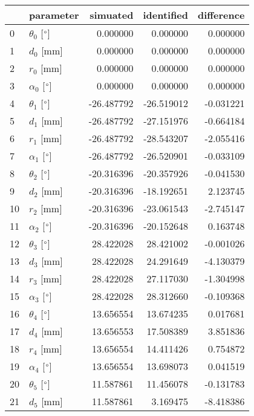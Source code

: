 \documentclass{standalone}%
\begin{document}
%
\normalsize%
\begin{tabular}{llrrr}
\toprule
{} &                 parameter &   simuated & identified & difference \\
\midrule
0  &  $\theta_{0}$ [$\degree$] &   0.000000 &   0.000000 &   0.000000 \\
1  &              $d_{0}$ [mm] &   0.000000 &   0.000000 &   0.000000 \\
2  &              $r_{0}$ [mm] &   0.000000 &   0.000000 &   0.000000 \\
3  &  $\alpha_{0}$ [$\degree$] &   0.000000 &   0.000000 &   0.000000 \\
4  &  $\theta_{1}$ [$\degree$] & -26.487792 & -26.519012 &  -0.031221 \\
5  &              $d_{1}$ [mm] & -26.487792 & -27.151976 &  -0.664184 \\
6  &              $r_{1}$ [mm] & -26.487792 & -28.543207 &  -2.055416 \\
7  &  $\alpha_{1}$ [$\degree$] & -26.487792 & -26.520901 &  -0.033109 \\
8  &  $\theta_{2}$ [$\degree$] & -20.316396 & -20.357926 &  -0.041530 \\
9  &              $d_{2}$ [mm] & -20.316396 & -18.192651 &   2.123745 \\
10 &              $r_{2}$ [mm] & -20.316396 & -23.061543 &  -2.745147 \\
11 &  $\alpha_{2}$ [$\degree$] & -20.316396 & -20.152648 &   0.163748 \\
12 &  $\theta_{3}$ [$\degree$] &  28.422028 &  28.421002 &  -0.001026 \\
13 &              $d_{3}$ [mm] &  28.422028 &  24.291649 &  -4.130379 \\
14 &              $r_{3}$ [mm] &  28.422028 &  27.117030 &  -1.304998 \\
15 &  $\alpha_{3}$ [$\degree$] &  28.422028 &  28.312660 &  -0.109368 \\
16 &  $\theta_{4}$ [$\degree$] &  13.656554 &  13.674235 &   0.017681 \\
17 &              $d_{4}$ [mm] &  13.656553 &  17.508389 &   3.851836 \\
18 &              $r_{4}$ [mm] &  13.656554 &  14.411426 &   0.754872 \\
19 &  $\alpha_{4}$ [$\degree$] &  13.656554 &  13.698073 &   0.041519 \\
20 &  $\theta_{5}$ [$\degree$] &  11.587861 &  11.456078 &  -0.131783 \\
21 &              $d_{5}$ [mm] &  11.587861 &   3.169475 &  -8.418386 \\

\end{tabular}
\end{document}
